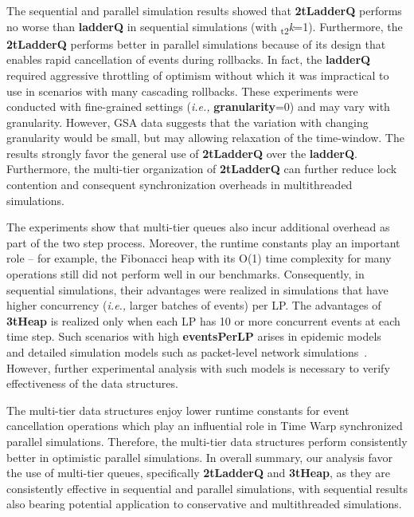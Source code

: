 The sequential and parallel simulation results showed that
\textbf{2tLadderQ} performs no worse than \textbf{ladderQ} in sequential
simulations (with \textsubscript{t2}\textit{k}=1).  Furthermore, the \textbf{2tLadderQ} performs
better in parallel simulations because of its design that enables
rapid cancellation of events during rollbacks.  In fact, the
\textbf{ladderQ} required aggressive throttling of optimism without which
it was impractical to use in scenarios with many cascading rollbacks.
These experiments were conducted with fine-grained settings (\textit{i.e.,}
\textbf{granularity}=0) and may vary with granularity.  However, GSA data
suggests that the variation with changing granularity would be small,
but may allowing relaxation of the time-window.  The results strongly
favor the general use of \textbf{2tLadderQ} over the \textbf{ladderQ}.
Furthermore, the multi-tier organization of \textbf{2tLadderQ} can further
reduce lock contention and consequent synchronization overheads in
multithreaded simulations.

The experiments show that multi-tier queues also incur additional
overhead as part of the two step process.  Moreover, the runtime
constants play an important role -- for example, the Fibonacci heap
with its O(1) time complexity for many operations still did not
perform well in our benchmarks.  Consequently, in sequential
simulations, their advantages were realized in simulations that have
higher concurrency (\textit{i.e.,} larger batches of events) per LP.
The advantages of \textbf{3tHeap} is realized only when each
LP has 10 or more concurrent events at each time step.  Such scenarios
with high \textbf{eventsPerLP} arises in epidemic models~\cite{yeom-14} and
detailed simulation models such as packet-level network
simulations~\cite{tang-05}.  However, further experimental analysis
with such models is necessary to verify effectiveness of the data
structures.

The multi-tier data structures enjoy lower runtime constants for event
cancellation operations which play an influential role in Time Warp
synchronized parallel simulations.  Therefore, the multi-tier data
structures perform consistently better in optimistic parallel
simulations.  In overall summary, our analysis favor the use of
multi-tier queues, specifically \textbf{2tLadderQ} and \textbf{3tHeap}, as they
are consistently effective in sequential and parallel simulations,
with sequential results also bearing potential application to
conservative and multithreaded simulations.



